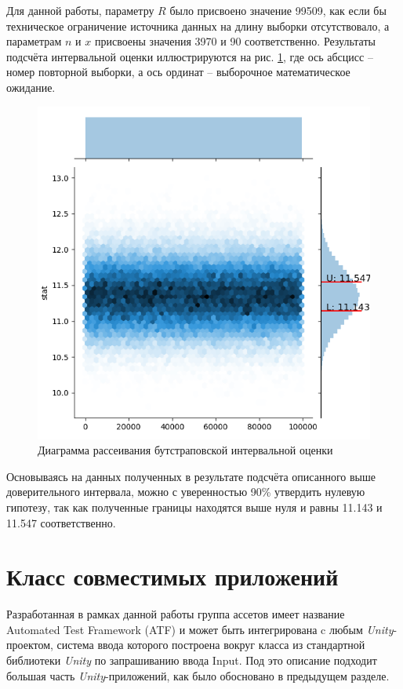 Для данной работы, параметру $R$ было присвоено значение 99509, как если бы техническое ограничение источника данных на длину выборки отсутствовало, а параметрам $n$ и $x$ присвоены значения 3970 и 90 соответственно. Результаты подсчёта интервальной оценки иллюстрируются на рис. \ref{experiment}, где ось абсцисс -- номер повторной выборки, а ось ординат -- выборочное математическое ожидание.

\begin{figure}[H]
	\centering
	\includegraphics[width=\linewidth]{experiment.png}
	\caption{Диаграмма рассеивания бутстраповской интервальной оценки}
	\label{experiment}
\end{figure}

Основываясь на данных полученных в результате подсчёта описанного выше доверительного интервала, можно с уверенностью 90\% утвердить нулевую гипотезу, так как полученные границы находятся выше нуля и равны 11.143 и 11.547 соответственно.

\section{Класс совместимых приложений}
Разработанная в рамках данной работы группа ассетов имеет название Automated Test Framework (ATF) и может быть интегрирована c любым  \textit{Unity}-проектом, система ввода которого построена вокруг класса из стандартной библиотеки \textit{Unity} по запрашиванию ввода Input. Под это описание подходит большая часть \textit{Unity}-приложений, как было обосновано в предыдущем разделе.

